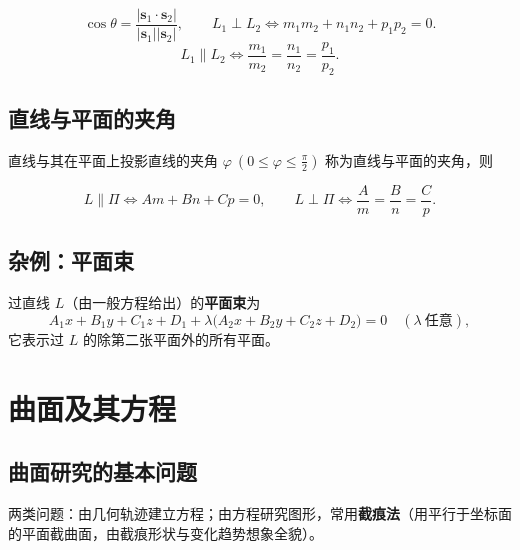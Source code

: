 \begin{equation}
\cos\theta=\frac{|\boldsymbol s_1\cdot\boldsymbol s_2|}{|\boldsymbol s_1||\boldsymbol s_2|},\qquad
L_1\perp L_2\iff m_1m_2+n_1n_2+p_1p_2=0 .
\end{equation}
\begin{equation}
L_1\parallel L_2\iff\frac{m_1}{m_2}=\frac{n_1}{n_2}=\frac{p_1}{p_2}.
\end{equation}

\subsection{直线与平面的夹角}

直线与其在平面上投影直线的夹角 $\varphi\ (0\le\varphi\le\frac\pi2)$ 称为直线与平面的夹角，则


\begin{equation}
L\parallel\Pi\iff Am+Bn+Cp=0,\qquad
L\perp\Pi\iff\frac Am=\frac Bn=\frac Cp .
\end{equation}

\subsection{杂例：平面束}

过直线 $L$（由一般方程给出）的\textbf{平面束}为
\begin{equation}
A_1x+B_1y+C_1z+D_1+\lambda\bigl(A_2x+B_2y+C_2z+D_2\bigr)=0\quad(\lambda\ \text{任意}),
\end{equation}
它表示过 $L$ 的除第二张平面外的所有平面。


\section{曲面及其方程}

\subsection{曲面研究的基本问题}

两类问题：由几何轨迹建立方程；由方程研究图形，常用\textbf{截痕法}（用平行于坐标面的平面截曲面，由截痕形状与变化趋势想象全貌）。


